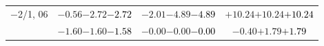 \documentclass[compress]{beamer}
\begin{document}
\begin{frame}
\begin{tabular}{r | c | c | c}
$-$2/1, 06 & $-0.56$\hspace{0.1 cm}$-2.72$\hspace{0.1 cm}\textcolor{black}{$-2.72$} & $-2.01$\hspace{0.1 cm}$-4.89$\hspace{0.1 cm}\textcolor{black}{$-4.89$} & $+10.24$\hspace{0.1 cm}$+10.24$\hspace{0.1 cm}\textcolor{black}{$+10.24$} \\
           & $-1.60$\hspace{0.1 cm}$-1.60$\hspace{0.1 cm}\textcolor{black}{$-1.58$} & $-0.00$\hspace{0.1 cm}$-0.00$\hspace{0.1 cm}\textcolor{black}{$-0.00$} & $-0.40$\hspace{0.1 cm}$+1.79$\hspace{0.1 cm}\textcolor{black}{$+1.79$} \\
\end{tabular}
\end{frame}
\end{document}
